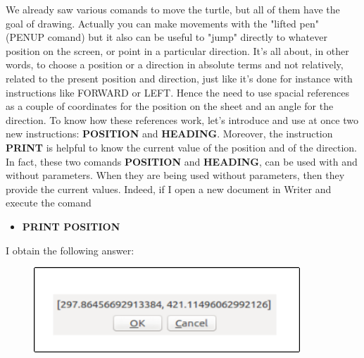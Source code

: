 We already saw various comands to move the turtle, but all of them have the goal of drawing. Actually you can make movements with the "lifted pen" (PENUP comand) but it also can be useful to "jump" directly to whatever position on the screen, or point in a particular direction. It's all about, in other words, to choose a position or a direction in absolute terms and not relatively, related to the present position and direction, just like it's done for instance with instructions like FORWARD or LEFT. Hence the need to use spacial references as a couple of coordinates for the position on the sheet and an angle for the direction. To know how these references work, let's introduce and use at once two new instructions: \textbf{POSITION}  and \textbf{HEADING}. Moreover, the instruction \textbf{PRINT} is helpful to know the current value of the position and of the direction. In fact, these two comands \textbf{POSITION} and \textbf{HEADING}, 
can be used with and without parameters. When they are being used without parameters, then they provide the current values. Indeed, if I open a new document in Writer and execute the comand

\vskip 1cm

\begin{scriptsize}
\begin{minipage}{1.0\textwidth}
\begin{itemize}[itemsep=-3pt,parsep=2pt]
\item[] \textbf{PRINT POSITION}
\end{itemize}
\end{minipage}
\end{scriptsize}

\vskip 1cm

I obtain the following answer:

\vskip 1cm

\begin{figure}[H]
   \centering
   \includegraphics[width=10.0cm,trim=8 8 8 8,clip]{./images/disegnare/disegnare-28.png}
   \label{dis-28}
\end{figure}

\vskip 1cm

